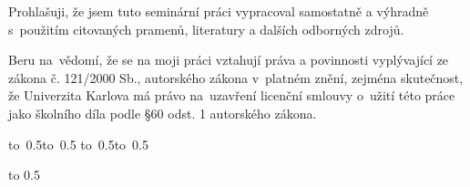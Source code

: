 \noindent
Prohlašuji, že jsem tuto seminární práci vypracoval samostatně a výhradně
s~použitím citovaných pramenů, literatury a dalších odborných zdrojů.

\medskip\noindent
Beru na~vědomí, že se na moji práci vztahují práva a povinnosti vyplývající
ze zákona č. 121/2000 Sb., autorského zákona v~platném znění, zejména skutečnost,
že Univerzita Karlova má právo na~uzavření licenční smlouvy o~užití této
práce jako školního díla podle §60 odst. 1 autorského zákona.

\vspace{10mm}

\hbox{\hbox to 0.5\hbox to 0.5\hsize{\dotfill\quad}}
\smallskip
\hbox{\hbox to 0.5\hsize{}\hbox to 0.5}

\vspace{20mm}
\newpage


\openright

\noindent

\newpage


\openright

\vbox to 0.5

\newpage



\openright
